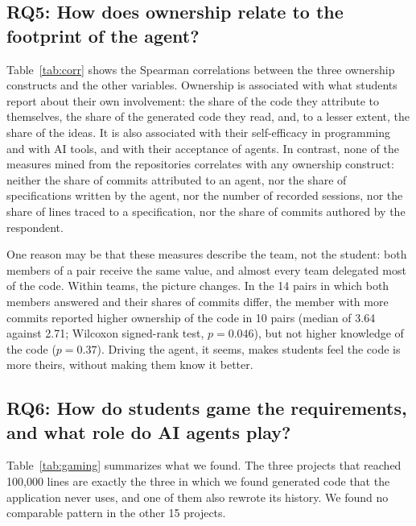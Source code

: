 \documentclass[conference]{IEEEtran}
\begin{document}
\subsection{RQ5: How does ownership relate to the footprint of the agent?}

Table~\ref{tab:corr} shows the Spearman correlations between the three ownership constructs and the other variables. Ownership is associated with what students report about their own involvement: the share of the code they attribute to themselves, the share of the generated code they read, and, to a lesser extent, the share of the ideas. It is also associated with their self-efficacy in programming and with AI tools, and with their acceptance of agents. In contrast, none of the measures mined from the repositories correlates with any ownership construct: neither the share of commits attributed to an agent, nor the share of specifications written by the agent, nor the number of recorded sessions, nor the share of lines traced to a specification, nor the share of commits authored by the respondent.

One reason may be that these measures describe the team, not the student: both members of a pair receive the same value, and almost every team delegated most of the code. Within teams, the picture changes. In the 14 pairs in which both members answered and their shares of commits differ, the member with more commits reported higher ownership of the code in 10 pairs (median of 3.64 against 2.71; Wilcoxon signed-rank test, $p = 0.046$), but not higher knowledge of the code ($p = 0.37$). Driving the agent, it seems, makes students feel the code is more theirs, without making them know it better.

\subsection{RQ6: How do students game the requirements, and what role do AI agents play?}
\label{sec:gaming}

Table~\ref{tab:gaming} summarizes what we found. The three projects that reached 100,000 lines are exactly the three in which we found generated code that the application never uses, and one of them also rewrote its history. We found no comparable pattern in the other 15 projects.
\end{document}
